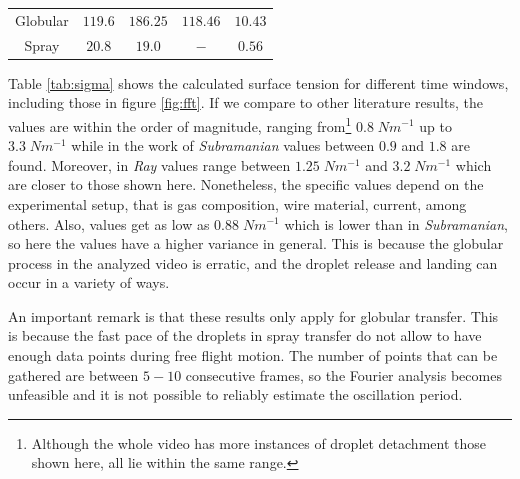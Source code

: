 \begin{table}
\begin{tabular}{ccccc}
\multicolumn{1}{|c|}{Globular} & $119.6$ & $186.25$ & $118.46$ & \multicolumn{1}{c|}{$10.43$} \\
\multicolumn{1}{|c|}{Spray} & $20.8$ & $19.0$ & $-$ & \multicolumn{1}{c|}{$0.56$} \\ \hline
\end{tabular}
\end{table}


Table \ref{tab:sigma} shows the calculated surface tension for different time windows, including those in figure \ref{fig:fft}. If we compare to other literature results, the values are within the order of magnitude, ranging from\footnote{Although the whole video has more instances of droplet detachment those shown here, all lie within the same range.} $0.8\;Nm^{-1}$ up to $3.3\;Nm^{-1}$ while in the work of \textit{Subramanian} \cite{surface_tension} values between $0.9$ and $1.8$ are found. Moreover, in \textit{Ray} \cite{Ray} values range between $1.25\;Nm^{-1}$ and $3.2\;Nm^{-1}$ which are closer to those shown here. Nonetheless, the specific values depend on the experimental setup, that is gas composition, wire material, current, among others. Also, values get as low as $0.88\;Nm^{-1}$ which is lower than in \textit{Subramanian}, so here the values have a higher variance in general. This is because the globular process in the analyzed video is erratic, and the droplet release and landing can occur in a variety of ways. 

An important remark is that these results only apply for globular transfer. This is because the fast pace of the droplets in spray transfer do not allow to have enough data points during free flight motion. The number of points that can be gathered are between $5-10$ consecutive frames, so the Fourier analysis becomes unfeasible and it is not possible to reliably estimate the oscillation period.


